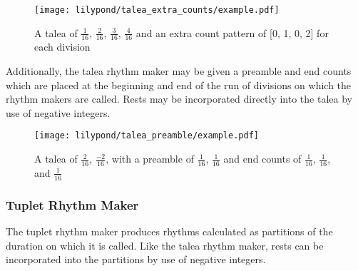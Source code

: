 \begin{figure}[H]
    \texttt{[image: lilypond/talea\_extra\_counts/example.pdf]}
    \caption{A talea of $\frac{1}{16}$, $\frac{2}{16}$, $\frac{3}{16}$, $\frac{4}{16}$ and an extra count pattern of [0, 1, 0, 2] for each division}
    \label{fig:taleaextracounts}
\end{figure}

Additionally, the talea rhythm maker may be given a preamble and end counts which are placed at the beginning and end of the run of divisions on which the rhythm makers are called. Rests may be incorporated directly into the talea by use of negative integers.


\begin{figure}[H]
    \texttt{[image: lilypond/talea\_preamble/example.pdf]}
    \caption{A talea of $\frac{2}{16}$, $\frac{-2}{16}$, with a preamble of $\frac{1}{16}$, $\frac{1}{16}$ and end counts of $\frac{1}{16}$, $\frac{1}{16}$, and $\frac{1}{16}$}
    \label{fig:taleapreamble}
\end{figure}

\subsubsection{Tuplet Rhythm Maker}

The tuplet rhythm maker produces rhythms calculated as partitions of the duration on which it is called. Like the talea rhythm maker, rests can be incorporated into the partitions by use of negative integers.


